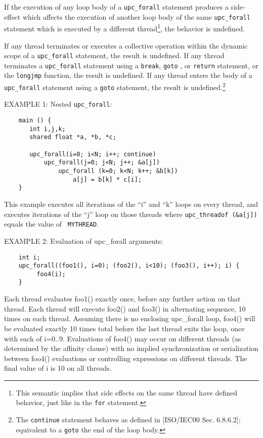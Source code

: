 \np If the execution of any loop body of a {\tt upc\_forall} statement
    produces a side-effect which affects the execution of another loop
    body of the same {\tt upc\_forall} statement which is executed by a different
    thread\footnote{This semantic implies that side effects on the same thread 
    have defined behavior, just like in the {\tt for} statement.}, the behavior is
    undefined.

\np If any thread terminates or executes a collective operation
   within the dynamic scope of a {\tt upc\_forall}
   statement, the result is undefined. If any thread terminates
   a  {\tt upc\_forall}  statement using a {\tt break},
   {\tt goto} , or {\tt return} statement, or the {\tt longjmp} function,
   the result is undefined.
   If any thread enters the body of a {\tt upc\_forall} statement
   using a {\tt goto} statement, the result is undefined.\footnote{The
   {\tt continue} statement behaves as defined in [ISO/IEC00 Sec. 
   6.8.6.2]; equivalent to a {\tt goto} the end of the loop body.}

\np EXAMPLE 1: Nested {\tt upc\_forall}: 

\begin{verbatim}
    main () { 
       int i,j,k; 
       shared float *a, *b, *c; 
    
       upc_forall(i=0; i<N; i++; continue) 
           upc_forall(j=0; j<N; j++; &a[j]) 
               upc_forall (k=0; k<N; k++; &b[k]) 
                   a[j] = b[k] * c[i]; 
    } 
\end{verbatim}

   This example executes all iterations of the ``i'' and ``k'' loops
   on every thread, and executes iterations of the ``j'' loop on those
   threads where {\tt upc\_threadof (\&a[j])} equals the value of {\tt
   MYTHREAD}.
   
\np EXAMPLE 2: Evaluation of upc\_forall arguments:

\begin{verbatim}
    int i;
    upc_forall((foo1(), i=0); (foo2(), i<10); (foo3(), i++); i) {
         foo4(i);
    }
\end{verbatim}
   Each thread evaluates foo1() exactly once, before any further action on that
   thread. Each thread will execute foo2() and foo3() in alternating sequence, 
   10 times on each thread. Assuming there is no enclosing upc\_forall loop, 
   foo4() will be evaluated exactly 10 times total before the last thread exits the 
   loop, once with each of i=0..9. Evaluations of foo4() may occur on different 
   threads (as determined by the affinity clause) with no implied synchronization 
   or serialization between foo4() evaluations or controlling expressions on 
   different threads. The final value of i is 10 on all threads.


